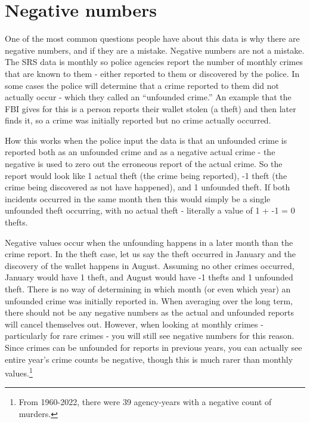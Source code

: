 \documentclass[
]{krantz}
\begin{document}
\section{Negative numbers}\label{negative-numbers}

One of the most common questions people have about this data
is why there are negative numbers, and if they are a
mistake. Negative numbers are not a mistake. The SRS data is
monthly so police agencies report the number of monthly
crimes that are known to them - either reported to them or
discovered by the police. In some cases the police will
determine that a crime reported to them did not actually
occur - which they called an ``unfounded crime.'' An example
that the FBI gives for this is a person reports their wallet
stolen (a theft) and then later finds it, so a crime was
initially reported but no crime actually occurred.

How this works when the police input the data is that an
unfounded crime is reported both as an unfounded crime and
as a negative actual crime - the negative is used to zero
out the erroneous report of the actual crime. So the report
would look like 1 actual theft (the crime being reported),
-1 theft (the crime being discovered as not have happened),
and 1 unfounded theft. If both incidents occurred in the
same month then this would simply be a single unfounded
theft occurring, with no actual theft - literally a value of
1 + -1 = 0 thefts.

Negative values occur when the unfounding happens in a later
month than the crime report. In the theft case, let us say
the theft occurred in January and the discovery of the
wallet happens in August. Assuming no other crimes occurred,
January would have 1 theft, and August would have -1 thefts
and 1 unfounded theft. There is no way of determining in
which month (or even which year) an unfounded crime was
initially reported in. When averaging over the long term,
there should not be any negative numbers as the actual and
unfounded reports will cancel themselves out. However, when
looking at monthly crimes - particularly for rare crimes -
you will still see negative numbers for this reason. Since
crimes can be unfounded for reports in previous years, you
can actually see entire year's crime counts be negative,
though this is much rarer than monthly values.\footnote{From
  1960-2022, there were 39 agency-years with a negative
  count of murders.}
\end{document}
